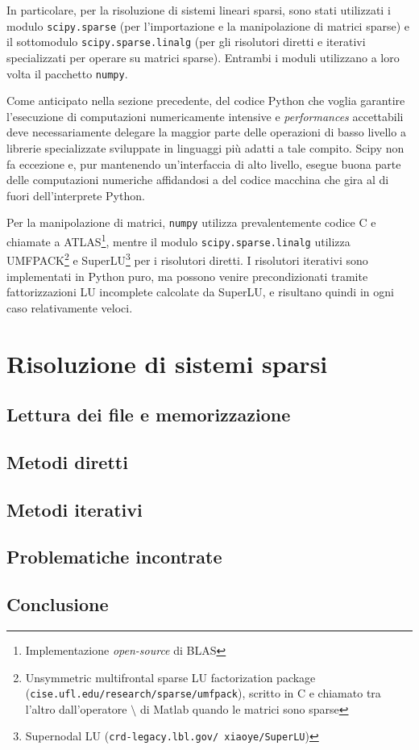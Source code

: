 \documentclass[11pt,a4paper]{scrartcl}
\begin{document}
In particolare, per la risoluzione di sistemi lineari sparsi, sono stati utilizzati i modulo \texttt{scipy.sparse} (per l'importazione e la manipolazione di matrici sparse) e il sottomodulo \texttt{scipy.sparse.linalg} (per gli risolutori diretti e iterativi specializzati per operare su matrici sparse). Entrambi i moduli utilizzano a loro volta il pacchetto \texttt{numpy}.

Come anticipato nella sezione precedente, del codice Python che voglia garantire l'esecuzione di computazioni numericamente intensive e \emph{performances} accettabili deve necessariamente delegare la maggior parte delle operazioni di basso livello a librerie specializzate sviluppate in linguaggi più adatti a tale compito. Scipy non fa eccezione e, pur mantenendo un'interfaccia di alto livello, esegue buona parte delle computazioni numeriche affidandosi a del codice macchina che gira al di fuori dell'interprete Python. 

Per la manipolazione di matrici, \texttt{numpy} utilizza prevalentemente codice C e chiamate a ATLAS\footnote{Implementazione \emph{open-source} di BLAS}, mentre il modulo \texttt{scipy.sparse.linalg} utilizza UMFPACK\footnote{Unsymmetric multifrontal sparse LU factorization package (\texttt{cise.ufl.edu/research/sparse/umfpack}), scritto in C e chiamato tra l'altro dall'operatore $\setminus$ di Matlab quando le matrici sono sparse} e SuperLU\footnote{Supernodal LU (\texttt{crd-legacy.lbl.gov/~xiaoye/SuperLU})} per i risolutori diretti. I risolutori iterativi sono implementati in Python puro, ma possono venire precondizionati tramite fattorizzazioni LU incomplete calcolate da SuperLU, e risultano quindi in ogni caso relativamente veloci.



\section*{Risoluzione di sistemi sparsi}

\subsection*{Lettura dei file e memorizzazione}

\subsection*{Metodi diretti}

\subsection*{Metodi iterativi}

\subsection*{Problematiche incontrate}

\subsection*{Conclusione}
\end{document}
